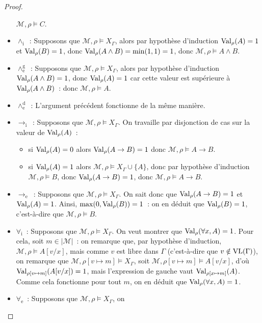 \begin{proof}
\begin{itemize}
    $\mathcal M,\rho\models C$.
  \item $\land_\mathrm i$~: Supposons que $\mathcal M,\rho\models X_\Gamma$,
    alors par hypothèse d'induction $\operatorname{Val}_\rho(A) = 1$ et $\operatorname{Val}_\rho(B) = 1$,
    donc $\operatorname{Val}_\rho(A\land B) = \min(1,1) = 1$, donc
    $\mathcal M,\rho\models A\land B$.
  \item $\land_\mathrm e^\mathrm g$~: Supposons que
    $\mathcal M,\rho\models X_\Gamma$, alors par hypothèse d'induction
    $\operatorname{Val}_\rho(A\land B) = 1$, donc $\operatorname{Val}_\rho(A) = 1$ car cette valeur est
    supérieure à $\operatorname{Val}_\rho(A\land B)$~: donc $\mathcal M,\rho\models A$.
  \item $\land_\mathrm e^\mathrm d$~: L'argument précédent fonctionne de la même
    manière.
  \item $\to_\mathrm i$~: Supposons que $\mathcal M,\rho\models X_\Gamma$. On
    travaille par disjonction de cas sur la valeur de $\operatorname{Val}_\rho(A)$~:
    \begin{itemize}
    \item si $\operatorname{Val}_\rho(A) = 0$ alors $\operatorname{Val}_\rho(A\to B) = 1$ donc
      $\mathcal M,\rho\models A \to B$.
    \item si $\operatorname{Val}_\rho(A) = 1$ alors $\mathcal M,\rho\models X_\Gamma\cup\{A\}$,
      donc par hypothèse d'induction $\mathcal M,\rho\models B$, donc
      $\operatorname{Val}_\rho(A\to B) = 1$, donc $\mathcal M,\rho\models A \to B$.
    \end{itemize}
  \item $\to_\mathrm e$~: Supposons que $\mathcal M,\rho\models X_\Gamma$. On sait
    donc que $\operatorname{Val}_\rho(A\to B) = 1$ et $\operatorname{Val}_\rho(A) = 1$. Ainsi,
    $\max(0,\operatorname{Val}_\rho(B)) = 1$~: on en déduit que $\operatorname{Val}_\rho(B) = 1$,
    c'est-à-dire que $\mathcal M,\rho\models B$.
  \item $\forall_\mathrm i$~: Supposons que $\mathcal M,\rho\models X_\Gamma$.
    On veut montrer que $\operatorname{Val}_\rho(\forall x, A) = 1$. Pour cela, soit
    $m \in |\mathcal M|$~: on remarque que, par hypothèse d'induction,
    $\mathcal M,\rho\models A[v/x]$, mais comme $v$ est libre dans $\Gamma$
    (c'est-à-dire que $v\notin\operatorname{VL}(\Gamma)$), on remarque que
    $\mathcal M,\rho[v\mapsto m]\models X_\Gamma$, soit
    $\mathcal M,\rho[v\mapsto m]\models A[v/x]$, d'où
    $\operatorname{Val}_{\rho[v\mapsto m]}(A[v/x]) = 1$, mais l'expression de gauche vaut
    $\operatorname{Val}_{\rho[x\mapsto m]}(A)$. Comme cela fonctionne pour tout $m$, on en
    déduit que $\operatorname{Val}_\rho(\forall x, A) = 1$.
  \item $\forall_\mathrm e$~: Supposons que $\mathcal M, \rho\models X_\Gamma$, on

\end{itemize}
\end{proof}
